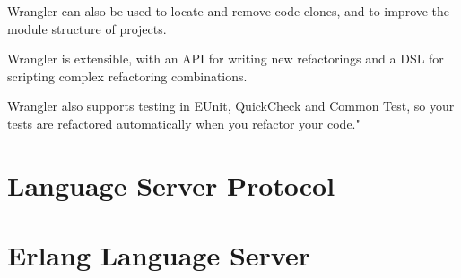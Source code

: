 Wrangler can also be used to locate and remove code clones, and to improve the module structure of projects.

Wrangler is extensible, with an API for writing new refactorings and a DSL for scripting complex refactoring combinations.

Wrangler also supports testing in EUnit, QuickCheck and Common Test, so your tests are refactored automatically when you refactor your code." \cite{WranglerHome}

\section{Language Server Protocol}


\section{Erlang Language Server}



